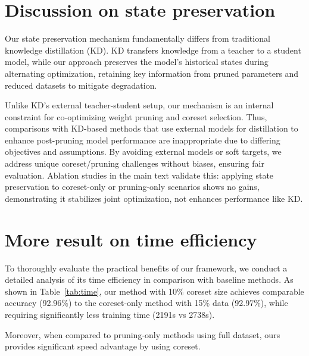 \section{Discussion on state preservation}
\label{appendix:state_preservation}
Our state preservation mechanism fundamentally differs from traditional knowledge distillation (KD). KD transfers knowledge from a teacher to a student model, while our approach preserves the model's historical states during alternating optimization, retaining key information from pruned parameters and reduced datasets to mitigate degradation.

Unlike KD's external teacher-student setup, our mechanism is an internal constraint for co-optimizing weight pruning and coreset selection. Thus, comparisons with KD-based methods that use external models for distillation to enhance post-pruning model performance are inappropriate due to differing objectives and assumptions. By avoiding external models or soft targets, we address unique coreset/pruning challenges without biases, ensuring fair evaluation.
Ablation studies in the main text validate this: applying state preservation to coreset-only or pruning-only scenarios shows no gains, demonstrating it stabilizes joint optimization, not enhances performance like KD.

\section{More result on time efficiency}
\label{appendix:time_efficiency}
To thoroughly evaluate the practical benefits of our framework, we conduct a detailed analysis of its time efficiency in comparison with baseline methods. As shown in Table~\ref{tab:time}, our method with 10\% coreset size achieves comparable accuracy (92.96\%) to the coreset-only method with 15\% data (92.97\%), while requiring significantly less training time (2191s vs 2738s).
\begin{table}[!htbp]  
\footnotesize   
\centering  
\caption{\textbf{Comparison of accuracy and time efficiency.} }   
\label{tab:time}  
\end{table} 
Moreover, when compared to pruning-only methods using full dataset, ours provides significant speed advantage by using coreset.

